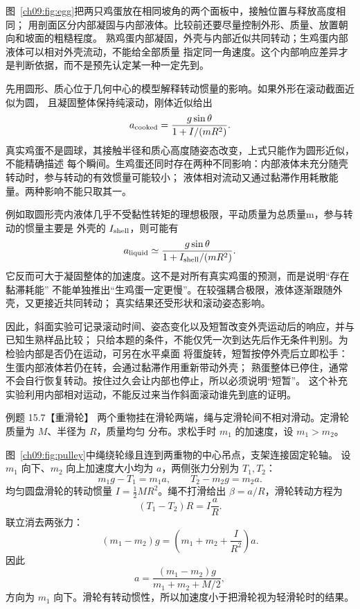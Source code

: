 \begin{xesolution}
图~\ref{ch09:fig:egg}把两只鸡蛋放在相同坡角的两个面板中，接触位置与释放高度相同；
用剖面区分内部凝固与内部液体。比较前还要尽量控制外形、质量、放置朝向和坡面的粗糙程度。
熟鸡蛋内部凝固，外壳与内部近似共同转动；生鸡蛋内部液体可以相对外壳流动，不能给全部质量
指定同一角速度。这个内部响应差异才是判断依据，而不是预先认定某一种一定先到。

先用圆形、质心位于几何中心的模型解释转动惯量的影响。如果外形在滚动截面近似为圆，
且凝固整体保持纯滚动，刚体近似给出
\[
 a_{\rm cooked}=\frac{g\sin\theta}{1+I/(mR^2)}.
\]
真实鸡蛋不是圆球，其接触半径和质心高度随姿态改变，上式只能作为圆形近似，不能精确描述
每个瞬间。生鸡蛋还同时存在两种不同影响：内部液体未充分随壳转动时，参与转动的有效惯量可能较小；
液体相对流动又通过黏滞作用耗散能量。两种影响不能只取其一。

例如取圆形壳内液体几乎不受黏性转矩的理想极限，平动质量为总质量m，参与转动的惯量主要是
外壳的 $I_{\rm shell}$，则可能有
\[
 a_{\rm liquid}\simeq\frac{g\sin\theta}{1+I_{\rm shell}/(mR^2)}.
\]
它反而可大于凝固整体的加速度。这不是对所有真实鸡蛋的预测，而是说明“存在黏滞耗能”
不能单独推出“生鸡蛋一定更慢”。在较强耦合极限，液体逐渐跟随外壳，又更接近共同转动；
真实结果还受形状和滚动姿态影响。

因此，斜面实验可记录滚动时间、姿态变化以及短暂改变外壳运动后的响应，并与已知生熟样品比较；
只给本题的条件，不能仅凭一次到达先后作无条件判别。为检验内部是否仍在运动，可另在水平桌面
将蛋旋转，短暂按停外壳后立即松手：生蛋内部液体若仍在转，会通过黏滞作用重新带动外壳；
熟蛋整体已停住，通常不会自行恢复转动。按住过久会让内部也停止，所以必须说明“短暂”。
这个补充实验利用内部相对运动，不能反过来当作斜面滚动谁先到底的证明。
\end{xesolution}

\Needspace{0.35\textheight}
\begin{origexamplebox}{例题 15.7【重滑轮】}
两个重物挂在滑轮两端，绳与定滑轮间不相对滑动。定滑轮质量为 $M$、半径为 $R$，质量均匀
分布。求松手时 $m_1$ 的加速度，设 $m_1>m_2$。
\massivePulleyDiagram
\end{origexamplebox}

\begin{xesolution}
图~\ref{ch09:fig:pulley}中绳绕轮缘且连到两重物的中心吊点，支架连接固定轮轴。
设 $m_1$ 向下、$m_2$ 向上加速度大小均为 $a$，两侧张力分别为 $T_1,T_2$：
\[
 m_1g-T_1=m_1a,
 \qquad
 T_2-m_2g=m_2a.
\]
均匀圆盘滑轮的转动惯量 $I=\tfrac12MR^2$。绳不打滑给出 $\beta=a/R$，滑轮转动方程为
\[
 (T_1-T_2)R=I\frac aR.
\]
联立消去两张力：
\[
 (m_1-m_2)g
 =\left(m_1+m_2+\frac I{R^2}\right)a.
\]
因此
\[
 \boxed{a=\frac{(m_1-m_2)g}{m_1+m_2+M/2}},
\]
方向为 $m_1$ 向下。滑轮有转动惯性，所以加速度小于把滑轮视为轻滑轮时的结果。
\end{xesolution}

